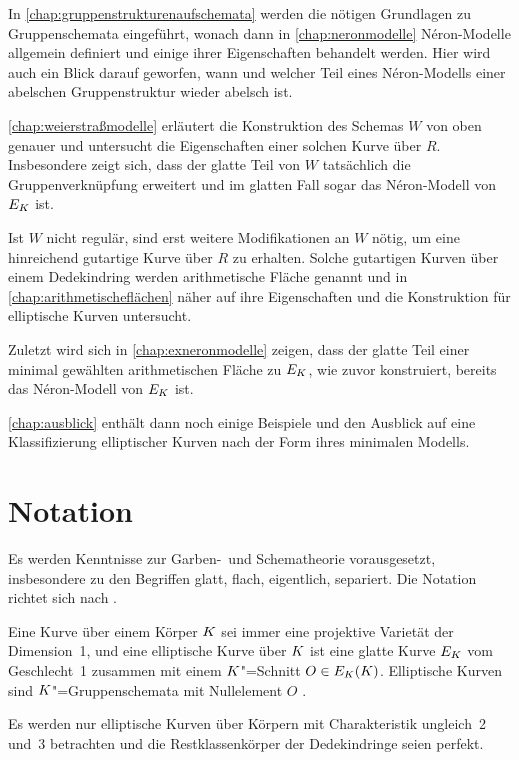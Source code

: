 In \autoref{chap:gruppenstrukturenaufschemata} werden die nötigen
Grundlagen zu Gruppenschemata eingeführt, wonach dann in
\autoref{chap:neronmodelle} Néron-Modelle allgemein definiert und
einige ihrer Eigenschaften behandelt werden.
Hier wird auch ein Blick darauf geworfen, wann und welcher Teil eines
Néron-Modells einer abelschen Gruppenstruktur wieder abelsch ist.

\autoref{chap:weierstraßmodelle} erläutert die Konstruktion des
Schemas $W$ von oben genauer und untersucht die Eigenschaften einer
solchen Kurve über $R$. Insbesondere zeigt sich, dass der glatte
Teil von $W$ tatsächlich die Gruppenverknüpfung erweitert 
und im glatten Fall sogar das Néron-Modell von $E_{K}$ ist.

Ist $W$ nicht regulär, sind erst weitere Modifikationen an $W$
nötig, um eine hinreichend gutartige Kurve über $R$ zu
erhalten. Solche gutartigen Kurven über einem Dedekindring werden
arithmetische Fläche genannt und in
\autoref{chap:arithmetischeflächen} näher auf ihre Eigenschaften und
die Konstruktion für elliptische Kurven untersucht.

Zuletzt wird sich in \autoref{chap:exneronmodelle} zeigen, dass der
glatte Teil einer minimal gewählten arithmetischen Fläche zu $E_{K}$,
wie zuvor konstruiert, bereits das Néron-Modell von $E_{K}$ ist.

\autoref{chap:ausblick} enthält dann noch einige Beispiele und den
Ausblick auf eine Klassifizierung elliptischer Kurven nach der Form
ihres minimalen Modells.

\section*{Notation}
Es werden Kenntnisse zur Garben-~und Schematheorie vorausgesetzt,
insbesondere zu den Begriffen glatt, flach, eigentlich, separiert.
Die Notation richtet sich nach \cite{wedhorn}.

Eine Kurve über einem Körper $K$ sei immer eine projektive Varietät
der Dimension~1,
und eine elliptische Kurve über $K$ ist eine glatte Kurve $E_{K}$
vom Geschlecht~1 zusammen mit einem $K$"=Schnitt $O\in E_{K}(K)$.
Elliptische Kurven sind $K$"=Gruppenschemata mit Nullelement $O$
\cite{silverman}.

Es werden nur elliptische Kurven über Körpern mit Charakteristik
ungleich~2 und~3 betrachten und die Restklassenkörper der
Dedekindringe seien perfekt.

